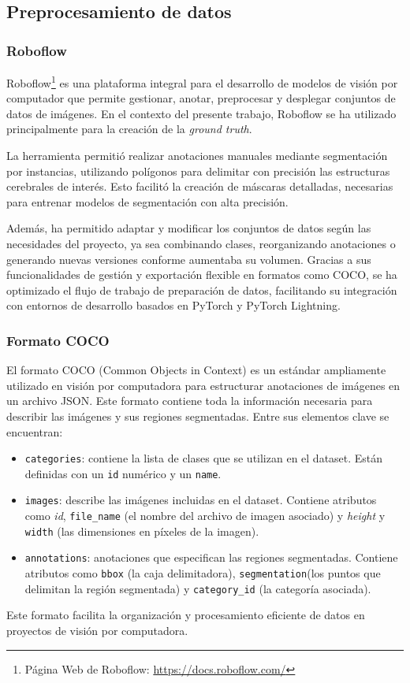 \subsection{Preprocesamiento de datos}
\subsubsection{Roboflow}
Roboflow\footnote{Página Web de Roboflow: \url{https://docs.roboflow.com/}} es una plataforma integral para el desarrollo de modelos de visión por computador que permite gestionar, anotar, preprocesar y desplegar conjuntos de datos de imágenes. En el contexto del presente trabajo, Roboflow se ha utilizado principalmente para la creación de la \textit{ground truth}.

La herramienta permitió realizar anotaciones manuales mediante segmentación por instancias, utilizando polígonos para delimitar con precisión las estructuras cerebrales de interés. Esto facilitó la creación de máscaras detalladas, necesarias para entrenar modelos de segmentación con alta precisión. 

Además, ha permitido adaptar y modificar los conjuntos de datos según las necesidades del proyecto, ya sea combinando clases, reorganizando anotaciones o generando nuevas versiones conforme aumentaba su volumen. Gracias a sus funcionalidades de gestión y exportación flexible en formatos como COCO, se ha optimizado el flujo de trabajo de preparación de datos, facilitando su integración con entornos de desarrollo basados en PyTorch y PyTorch Lightning.

\subsubsection{Formato COCO}
El formato COCO (Common Objects in Context) es un estándar ampliamente utilizado en visión por computadora para estructurar anotaciones de imágenes en un archivo JSON. Este formato contiene toda la información necesaria para describir las imágenes y sus regiones segmentadas. Entre sus elementos clave se encuentran:
\begin{itemize}
    \item \texttt{categories}: contiene la lista de clases que se utilizan en el dataset. Están definidas con un \texttt{id} numérico y un \texttt{name}.
    \item \texttt{images}: describe las imágenes incluidas en el dataset. Contiene atributos como \textit{id}, \texttt{file\_name} (el nombre del archivo de imagen asociado) y \textit{height} y \texttt{width} (las dimensiones en píxeles de la imagen).
    \item \texttt{annotations}: anotaciones que especifican las regiones segmentadas. Contiene atributos como \texttt{bbox} (la caja delimitadora), \texttt{segmentation}(los puntos que delimitan la región segmentada) y \texttt{category\_id} (la categoría asociada). 
\end{itemize}
Este formato facilita la organización y procesamiento eficiente de datos en proyectos de visión por computadora.
    

